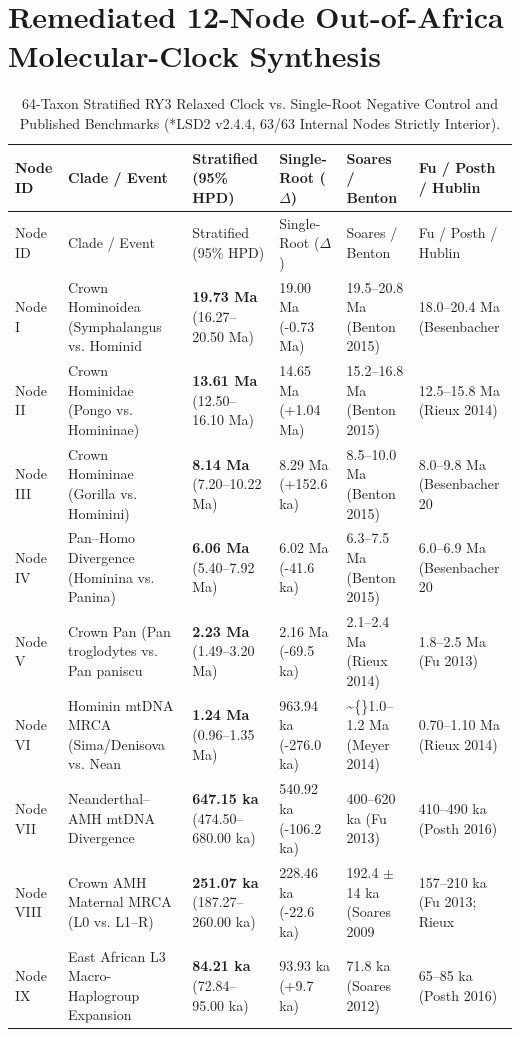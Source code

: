 \documentclass[10pt,letterpaper]{article}
\begin{document}
\section{Remediated 12-Node Out-of-Africa Molecular-Clock Synthesis}
\begin{longtable}{llllll}
\caption{64-Taxon Stratified RY3 Relaxed Clock vs. Single-Root Negative Control and Published Benchmarks (*LSD2 v2.4.4, 63/63 Internal Nodes Strictly Interior).} \\
\toprule
Node ID & Clade / Event & Stratified (95\% HPD) & Single-Root ($\Delta$) & Soares / Benton & Fu / Posth / Hublin \\
\midrule
\endfirsthead
\toprule
Node ID & Clade / Event & Stratified (95\% HPD) & Single-Root ($\Delta$) & Soares / Benton & Fu / Posth / Hublin \\
\midrule
\endhead
Node I & Crown Hominoidea (Symphalangus vs. Hominid & \textbf{19.73 Ma} (16.27--20.50 Ma) & 19.00 Ma (-0.73 Ma) & 19.5--20.8 Ma (Benton 2015) & 18.0--20.4 Ma (Besenbacher  \\
Node II & Crown Hominidae (Pongo vs. Homininae) & \textbf{13.61 Ma} (12.50--16.10 Ma) & 14.65 Ma (+1.04 Ma) & 15.2--16.8 Ma (Benton 2015) & 12.5--15.8 Ma (Rieux 2014) \\
Node III & Crown Homininae (Gorilla vs. Hominini) & \textbf{8.14 Ma} (7.20--10.22 Ma) & 8.29 Ma (+152.6 ka) & 8.5--10.0 Ma (Benton 2015) & 8.0--9.8 Ma (Besenbacher 20 \\
Node IV & Pan--Homo Divergence (Hominina vs. Panina) & \textbf{6.06 Ma} (5.40--7.92 Ma) & 6.02 Ma (-41.6 ka) & 6.3--7.5 Ma (Benton 2015) & 6.0--6.9 Ma (Besenbacher 20 \\
Node V & Crown Pan (Pan troglodytes vs. Pan paniscu & \textbf{2.23 Ma} (1.49--3.20 Ma) & 2.16 Ma (-69.5 ka) & 2.1--2.4 Ma (Rieux 2014) & 1.8--2.5 Ma (Fu 2013) \\
Node VI & Hominin mtDNA MRCA (Sima/Denisova vs. Nean & \textbf{1.24 Ma} (0.96--1.35 Ma) & 963.94 ka (-276.0 ka) & \textasciitilde\{\}1.0--1.2 Ma (Meyer 2014) & 0.70--1.10 Ma (Rieux 2014) \\
Node VII & Neanderthal--AMH mtDNA Divergence & \textbf{647.15 ka} (474.50--680.00 ka) & 540.92 ka (-106.2 ka) & 400--620 ka (Fu 2013) & 410--490 ka (Posth 2016) \\
Node VIII & Crown AMH Maternal MRCA (L0 vs. L1--R) & \textbf{251.07 ka} (187.27--260.00 ka) & 228.46 ka (-22.6 ka) & 192.4 $\pm$ 14 ka (Soares 2009 & 157--210 ka (Fu 2013; Rieux \\
Node IX & East African L3 Macro-Haplogroup Expansion & \textbf{84.21 ka} (72.84--95.00 ka) & 93.93 ka (+9.7 ka) & 71.8 ka (Soares 2012) & 65--85 ka (Posth 2016) \\

\end{longtable}
\end{document}
